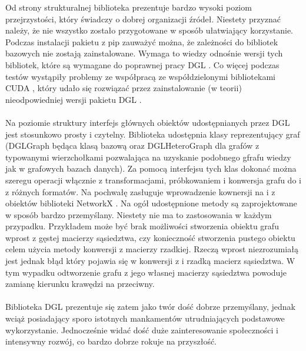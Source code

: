 \documentclass{article}
\begin{document}
 Od strony strukturalnej biblioteka prezentuje bardzo wysoki poziom przejrzystości, który świadczy o dobrej organizacji źródeł. Niestety przyznać należy, że nie wszystko zostało przygotowane w sposób ułatwiający korzystanie. Podczas instalacji pakietu z pip zauważyć można, że zależności do bibliotek bazowych nie zostają zainstalowane. Wymaga to wiedzy odnośnie wersji tych bibliotek, które są wymagane do poprawnej pracy DGL \cite{dgl}. Co więcej podczas testów wystąpiły problemy ze współpracą ze współdzielonymi bibliotekami CUDA \cite{cuda}, który udało się rozwiązać przez zainstalowanie (w teorii) nieodpowiedniej wersji pakietu DGL \cite{dgl}.

 \paragraph{}
 Na poziomie struktury interfejs głównych obiektów udostępnianych przez DGL \cite{dgl} jest stosunkowo prosty i czytelny. Biblioteka udostępnia klasy reprezentujący graf (DGLGraph będąca klasą bazową oraz DGLHeteroGraph dla grafów z typowanymi wierzchołkami pozwalająca na uzyskanie podobnego gfrafu wiedzy jak w grafowych bazach danych). Za pomocą interfejsu tych klas dokonać można szeregu operacji włącznie z transformacjami, próbkowaniem i konwersja grafu do i z różnych formatów. Na pochwałę zasługuje wprowadzenie kownersji na i z obiektów biblioteki NetworkX \cite{nx}.  Na ogół udostępnione metody są zaprojektowane w sposób bardzo przemyślany. Niestety nie ma to zastosowania w każdym przypadku. Przykładem może być brak możliwości stworzenia obiektu grafu wprost z gęstej macierzy sąsiedztwa, czy konieczność stworzenia pustego obiektu celem użycia metody konwersji z macierzy rzadkiej. Rzeczą wprost niezrozumiałą jest jednak błąd który pojawia się w konwersji z i rzadką macierz sąsiedztwa. W tym wypadku odtworzenie grafu z jego własnej macierzy sąsiedztwa powoduje zamianę kierunku krawędzi na przeciwny.

\paragraph{}
Biblioteka DGL \cite{dgl} prezentuje się zatem jako twór dość dobrze przemyślany, jednak wciąż posiadający sporo istotnych mankamentów utrudniających podstawowe wykorzystanie. Jednocześnie widać dość duże zainteresowanie społeczności i intensywny rozwój, co bardzo dobrze rokuje na przyszłość.
\end{document}
